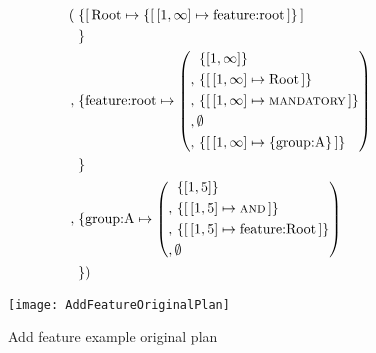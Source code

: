 \begin{align*}
  (&\; \{  \mapping{\text{Root}}{\set{\intervalmapping{1}{\forever}{\text{feature:root}}}} \\
   &\; \}\\
    ,&\; \{  \text{feature:root} \mapsto \left( \begin{aligned}
          \, & \set{\interval{1}{\forever}} \\
       ,  \, & \set{\intervalmapping{1}{\forever}{\text{Root}}} \\
       ,  \, & \set{\intervalmapping{1}{\forever}{\mandatory}} \\
       ,  \, & \emptyset \\
       ,  \, & \set{\intervalmapping{1}{\forever}{\set{\text{group:A}}}} \\
  \end{aligned}\right) \\
   &\; \}\\ 
          ,&\; \{ \text{group:A} \mapsto \left( \begin{aligned}
                & \set{\interval{1}{5}} \\
                , \, & \set{\intervalmapping{1}{5}{\andtype}} \\
                , \, & \set{\intervalmapping{1}{5}{\text{feature:Root}}} \\
                , \, & \emptyset \\
            \end{aligned} \right) \\
   &\; \})
\end{align*}

\begin{figure}[h]
  \centering
  \texttt{[image: AddFeatureOriginalPlan]}
  \caption{Add feature example \textemdash{} original plan}
  \label{ex:add-feature-original-plan}
\end{figure}

